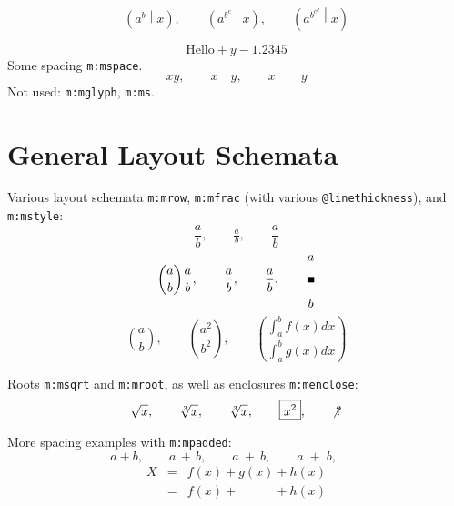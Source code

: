 \documentclass{article}
\makeatletter
\newcommand{\mml}[1]{\texttt{m:#1}}
\newcommand{\attr}[1]{\texttt{@#1}}
\makeatother
\begin{document}
\begin{equation}
\left( a^{b}  \middle| x \right),\qquad
\left( a^{b^{c}} \middle| x \right),\qquad
\left( a^{b^{c^{d}}} \middle| x \right)
\end{equation}

\begin{equation}
 \mbox{Hello} + y - 1.2345
\end{equation}
Some spacing \mml{mspace}.
\begin{equation}
  xy,\qquad
  x \hspace{1em} y,\qquad
  x \hspace{2em} y
\end{equation}
Not used: \mml{mglyph}, \mml{ms}.

\section{General Layout Schemata}
Various layout schemata \mml{mrow}, \mml{mfrac} (with various \attr{linethickness}),
and \mml{mstyle}:
\begin{equation}
 \frac{a}{b},\qquad
 \tfrac{a}{b},\qquad
 \dfrac{a}{b} 
\end{equation}
\begin{equation} 
 \binom{a}{b} 
 \genfrac{}{}{0.0ex}{}{a}{b},\qquad
 \genfrac{}{}{0.01ex}{}{a}{b},\qquad
 \genfrac{}{}{0.1ex}{}{a}{b},\qquad
 \genfrac{}{}{1ex}{}{a}{b}
\end{equation}
\begin{equation} 
 \genfrac{(}{)}{}{}{a}{b},\qquad
 \genfrac{(}{)}{}{}{a^2}{b^2},\qquad
 \genfrac{(}{)}{}{}{\int_a^b f(x)dx}{\int_a^b g(x)dx} 
\end{equation}

Roots \mml{msqrt} and \mml{mroot}, as well as enclosures \mml{menclose}:
\begin{equation}
 \sqrt{x},\qquad
 \sqrt[3]{x},\qquad
 \root 3 \of {x},\qquad
 \boxed{x^2},\qquad
 \not{?} 
\end{equation}


More spacing examples with \mml{mpadded}:
\begin{equation}
  a+b, \qquad
  a \,+\, b, \qquad
  a \>+\> b, \qquad
  a \;+\; b, \qquad
\end{equation}
\begin{eqnarray}
  X &=& f(x) + g(x) + h(x) \\
    &=& f(x) + \phantom{g(x)} + h(x) \\
\end{eqnarray}
\end{document}
